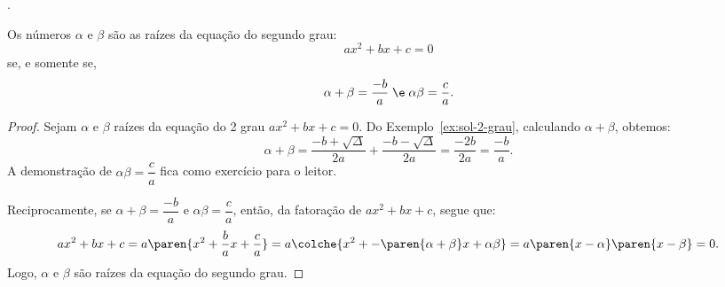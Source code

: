 \begin{onlineact}
	.
\end{onlineact}

\begin{theorem}
	Os números $\alpha$ e $\beta$ são as raízes da equação do segundo grau:
	\[
		ax^2 + bx + c = 0
	\]
	se, e somente se,
	\[
		\alpha + \beta = \dfrac {-b} a \; \e \; \alpha \beta = \dfrac c a.
	\]
\end{theorem}

\begin{proof}
	Sejam $\alpha$ e $\beta$ raízes da equação do 2\tdeg{} grau $ax^2 + bx + c = 0$. Do Exemplo~\ref{ex:sol-2-grau}, calculando $\alpha+\beta$, obtemos:
	\[
		\alpha+\beta = \dfrac{-b+\sqrt\Delta}{2a}+\dfrac{-b-\sqrt\Delta}{2a} = \dfrac{-2b}{2a}=\dfrac{-b}{a}.
	\]
	A demonstração de $\alpha\beta = \dfrac c a$ fica como exercício para o leitor.

    Reciprocamente, se $\alpha+\beta = \dfrac {-b} a$ e $\alpha\beta = \dfrac c a$, então, da fatoração de $ax^2 + bx + c$, segue que:
    \[
        ax^2 + bx + c = a\paren{x^2 + \frac {b} a x+ \frac c a} = a\colche{x^2 + -\paren{\alpha+\beta} x+ \alpha\beta} = a\paren{x - \alpha}\paren{x - \beta} = 0.
    \]
    Logo, $\alpha$ e $\beta$ são raízes da equação do segundo grau.
\end{proof}